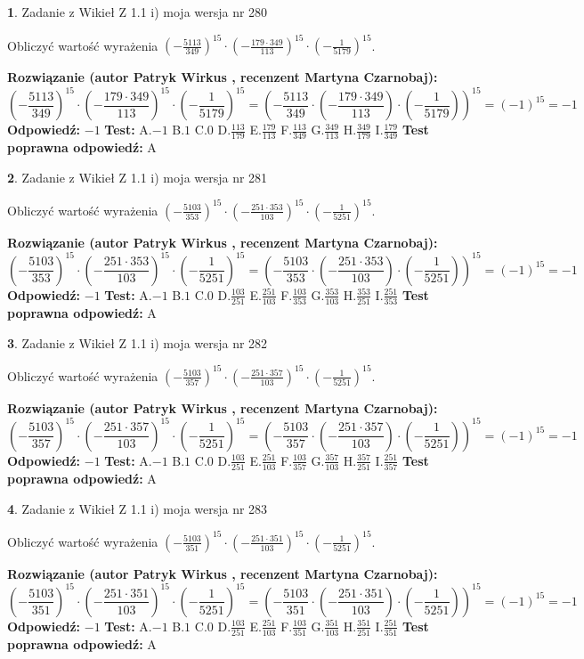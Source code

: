 \documentclass[12pt, a4paper]{article}
\theoremstyle{definition} %
\newtheorem{zad}{}
\newcommand{\zadStart}[1]{\begin{zad}#1\newline}
\newcommand{\zadStop}{\end{zad}}
\newcommand{\rozwStart}[2]{\noindent \textbf{Rozwiązanie (autor #1 , recenzent #2): }\newline}
\newcommand{\rozwStop}{\newline}
\newcommand{\odpStart}{\noindent \textbf{Odpowiedź:}\newline}
\newcommand{\odpStop}{\newline}
\newcommand{\testStart}{\noindent \textbf{Test:}\newline}
\newcommand{\testStop}{\newline}
\newcommand{\kluczStart}{\noindent \textbf{Test poprawna odpowiedź:}\newline}
\newcommand{\kluczStop}{\newline}
\begin{document}
\zadStart{Zadanie z Wikieł Z 1.1 i) moja wersja nr 280}

Obliczyć wartość wyrażenia $(-\frac{5113}{349})^{15} \cdot (-\frac{179 \cdot 349}{113})^{15} \cdot (-\frac{1}{5179})^{15}$.
\zadStop
\rozwStart{Patryk Wirkus}{Martyna Czarnobaj}
$$(-\frac{5113}{349})^{15} \cdot (-\frac{179 \cdot 349}{113})^{15} \cdot (-\frac{1}{5179})^{15} = (-\frac{5113}{349} \cdot (-\frac{179 \cdot 349}{113}) \cdot (-\frac{1}{5179}))^{15} = (-1)^{15} = -1$$
\rozwStop
\odpStart
$-1$
\odpStop
\testStart
A.$-1$ B.$1$ C.$0$ D.$\frac{113}{179}$ E.$\frac{179}{113}$
F.$\frac{113}{349}$ G.$\frac{349}{113}$
H.$\frac{349}{179}$
I.$\frac{179}{349}$
\testStop
\kluczStart
A
\kluczStop



\zadStart{Zadanie z Wikieł Z 1.1 i) moja wersja nr 281}

Obliczyć wartość wyrażenia $(-\frac{5103}{353})^{15} \cdot (-\frac{251 \cdot 353}{103})^{15} \cdot (-\frac{1}{5251})^{15}$.
\zadStop
\rozwStart{Patryk Wirkus}{Martyna Czarnobaj}
$$(-\frac{5103}{353})^{15} \cdot (-\frac{251 \cdot 353}{103})^{15} \cdot (-\frac{1}{5251})^{15} = (-\frac{5103}{353} \cdot (-\frac{251 \cdot 353}{103}) \cdot (-\frac{1}{5251}))^{15} = (-1)^{15} = -1$$
\rozwStop
\odpStart
$-1$
\odpStop
\testStart
A.$-1$ B.$1$ C.$0$ D.$\frac{103}{251}$ E.$\frac{251}{103}$
F.$\frac{103}{353}$ G.$\frac{353}{103}$
H.$\frac{353}{251}$
I.$\frac{251}{353}$
\testStop
\kluczStart
A
\kluczStop



\zadStart{Zadanie z Wikieł Z 1.1 i) moja wersja nr 282}

Obliczyć wartość wyrażenia $(-\frac{5103}{357})^{15} \cdot (-\frac{251 \cdot 357}{103})^{15} \cdot (-\frac{1}{5251})^{15}$.
\zadStop
\rozwStart{Patryk Wirkus}{Martyna Czarnobaj}
$$(-\frac{5103}{357})^{15} \cdot (-\frac{251 \cdot 357}{103})^{15} \cdot (-\frac{1}{5251})^{15} = (-\frac{5103}{357} \cdot (-\frac{251 \cdot 357}{103}) \cdot (-\frac{1}{5251}))^{15} = (-1)^{15} = -1$$
\rozwStop
\odpStart
$-1$
\odpStop
\testStart
A.$-1$ B.$1$ C.$0$ D.$\frac{103}{251}$ E.$\frac{251}{103}$
F.$\frac{103}{357}$ G.$\frac{357}{103}$
H.$\frac{357}{251}$
I.$\frac{251}{357}$
\testStop
\kluczStart
A
\kluczStop



\zadStart{Zadanie z Wikieł Z 1.1 i) moja wersja nr 283}

Obliczyć wartość wyrażenia $(-\frac{5103}{351})^{15} \cdot (-\frac{251 \cdot 351}{103})^{15} \cdot (-\frac{1}{5251})^{15}$.
\zadStop
\rozwStart{Patryk Wirkus}{Martyna Czarnobaj}
$$(-\frac{5103}{351})^{15} \cdot (-\frac{251 \cdot 351}{103})^{15} \cdot (-\frac{1}{5251})^{15} = (-\frac{5103}{351} \cdot (-\frac{251 \cdot 351}{103}) \cdot (-\frac{1}{5251}))^{15} = (-1)^{15} = -1$$
\rozwStop
\odpStart
$-1$
\odpStop
\testStart
A.$-1$ B.$1$ C.$0$ D.$\frac{103}{251}$ E.$\frac{251}{103}$
F.$\frac{103}{351}$ G.$\frac{351}{103}$
H.$\frac{351}{251}$
I.$\frac{251}{351}$
\testStop
\kluczStart
A
\kluczStop
\end{document}
